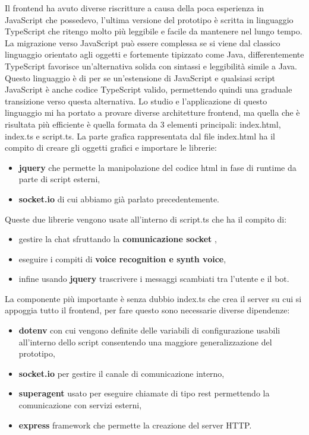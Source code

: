 Il frontend ha avuto diverse riscritture a causa della poca esperienza in JavaScript che possedevo, l'ultima versione del prototipo è scritta in linguaggio TypeScript che ritengo molto più leggibile e facile da mantenere nel lungo tempo.
La migrazione verso JavaScript può essere complessa se si viene dal classico linguaggio orientato agli oggetti e fortemente tipizzato come Java, differentemente TypeScript favorisce un'alternativa solida con sintassi e leggibilità simile a Java.
Questo linguaggio è di per se un'estensione di JavaScript e qualsiasi script JavaScript è anche codice TypeScript valido, permettendo quindi una graduale transizione verso questa alternativa.
Lo studio e l'applicazione di questo linguaggio mi ha portato a provare diverse architetture frontend, ma quella che è risultata più efficiente è quella formata da 3 elementi principali: index.html, index.ts e script.ts.
La parte grafica rappresentata dal file index.html ha il compito di creare gli oggetti grafici e importare le librerie:
\begin{itemize}
\item \textbf{jquery} che permette la manipolazione del codice html in fase di runtime da parte di script esterni,
\item \textbf{socket.io} di cui abbiamo già parlato precedentemente.
\end{itemize}
Queste due librerie vengono usate all'interno di script.ts che ha il compito di:
\begin{itemize}
\item gestire la chat sfruttando la \textbf{comunicazione socket} ,
\item eseguire i compiti di \textbf{voice recognition e synth voice},
\item infine usando \textbf{jquery} trascrivere i messaggi scambiati tra l'utente e il bot.
\end{itemize}
La componente più importante è senza dubbio index.ts che crea il server su cui si appoggia tutto il frontend, per fare questo sono necessarie diverse dipendenze:
\begin{itemize}
\item \textbf{dotenv} con cui vengono definite delle variabili di configurazione usabili all'interno dello script consentendo una maggiore generalizzazione del prototipo,
\item \textbf{socket.io} per gestire il canale di comunicazione interno,
\item \textbf{superagent} usato per eseguire chiamate di tipo rest permettendo la comunicazione con servizi esterni,
\item  \textbf{express} framework che permette la creazione del server HTTP.
\end{itemize}
